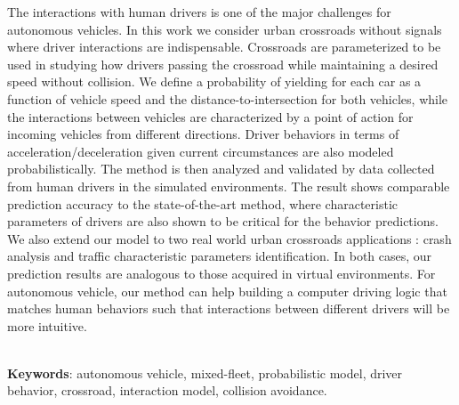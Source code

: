 The interactions with human drivers is one of the major challenges for autonomous vehicles. In this work we consider urban crossroads without signals where driver interactions are indispensable. Crossroads are parameterized to be used in studying how drivers passing the crossroad while maintaining a desired speed without collision. We define a probability of yielding for each car as a function of vehicle speed and the distance-to-intersection for both vehicles, while the interactions between vehicles are characterized by a point of action for incoming vehicles from different directions. Driver behaviors in terms of acceleration/deceleration given current circumstances are also modeled probabilistically. The method is then analyzed and validated by data collected from human drivers in the simulated environments. The result shows comparable prediction accuracy to the state-of-the-art method, where characteristic parameters of drivers are also shown to be critical for the behavior predictions. We also extend our model to two real world urban crossroads applications : crash analysis and traffic characteristic parameters identification. In both cases, our prediction results are analogous to those acquired in virtual environments. For autonomous vehicle, our method can help building a computer driving logic that matches human behaviors such that  interactions between different drivers will be more intuitive. %

~\\

\textbf{Keywords}:  autonomous vehicle, mixed-fleet, probabilistic model, driver behavior, crossroad, interaction model, collision avoidance.